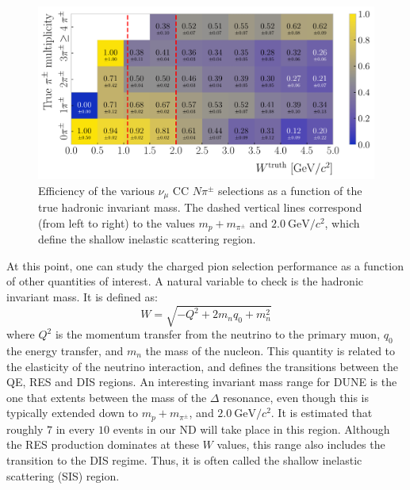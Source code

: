 \begin{figure}[t]
    \centering
    \includegraphics[width=.90\linewidth]{Images/GAr_selection/pion_selection_efficiency_versus_invariant_mass.pdf}
    \caption[Efficiency of the $\nu_{\mu}$ CC $N\pi^{\pm}$ selections as a function of the hadronic invariant mass.]{Efficiency of the various $\nu_{\mu}$ CC $N\pi^{\pm}$ selections as a function of the true hadronic invariant mass. The dashed vertical lines correspond (from left to right) to the values $m_{p}+m_{\pi^{\pm}}$ and $2.0~\mathrm{GeV}/c^{2}$, which define the shallow inelastic scattering region.}
    \label{fig:efficiency_vs_invariant_mass}
\end{figure}

At this point, one can study the charged pion selection performance as a function of other quantities of interest. A natural variable to check is the hadronic invariant mass. It is defined as:
\begin{equation}
W = \sqrt{-Q^{2} + 2 m_{n} q_{0} + m_{n}^{2}}
\end{equation}
where $Q^{2}$ is the momentum transfer from the neutrino to the primary muon, $q_{0}$ the energy transfer, and $m_{n}$ the mass of the nucleon. This quantity is related to the elasticity of the neutrino interaction, and defines the transitions between the QE, RES and DIS regions. An interesting invariant mass range for DUNE is the one that extents between the mass of the $\Delta$ resonance, even though this is typically extended down to $m_{p}+m_{\pi^{\pm}}$, and $2.0~\mathrm{GeV}/c^{2}$. It is estimated that roughly $7$ in every $10$ events in our ND will take place in this region. Although the RES production dominates at these $W$ values, this range also includes the transition to the DIS regime. Thus, it is often called the shallow inelastic scattering (SIS) region.

